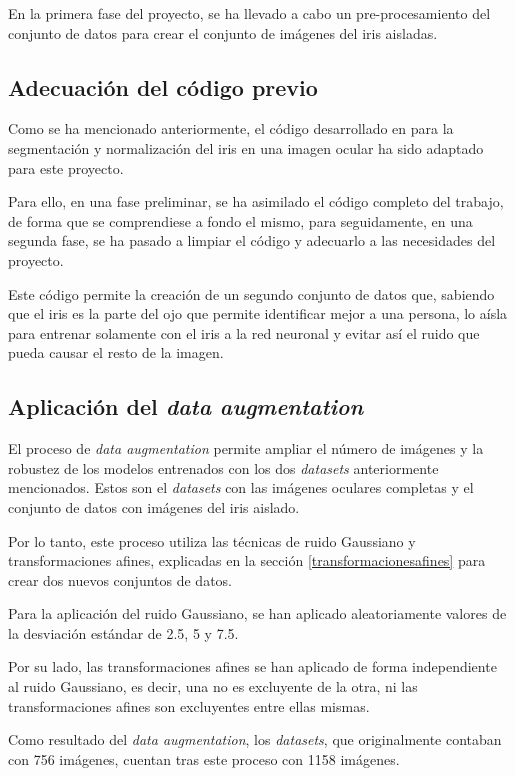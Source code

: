 En la primera fase del proyecto, se ha llevado a cabo un pre-procesamiento del conjunto de datos para crear el conjunto de imágenes del iris aisladas.

\subsection{Adecuación del código previo}

Como se ha mencionado anteriormente, el código desarrollado en \cite{tfg_iris_2020} para la segmentación y normalización del iris en una imagen ocular ha sido adaptado para este proyecto. 

Para ello, en una fase preliminar, se ha asimilado el código completo del trabajo, de forma que se comprendiese a fondo el mismo, para seguidamente, en una segunda fase, se ha pasado a limpiar el código y adecuarlo a las necesidades del proyecto. 

Este código permite la creación de un segundo conjunto de datos que, sabiendo que el iris es la parte del ojo que permite identificar mejor a una persona, lo aísla para entrenar solamente con el iris a la red neuronal y evitar así el ruido que pueda causar el resto de la imagen. 

\subsection{Aplicación del \textit{data augmentation}}

El proceso de \textit{data augmentation} permite ampliar el número de imágenes y la robustez de los modelos entrenados con los dos \textit{datasets} anteriormente mencionados. Estos son el \textit{datasets} con las imágenes oculares completas y el conjunto de datos con imágenes del iris aislado. 

Por lo tanto, este proceso utiliza las técnicas de ruido Gaussiano y transformaciones afines, explicadas en la sección \ref{transformacionesafines} para crear dos nuevos conjuntos de datos. 

Para la aplicación del ruido Gaussiano, se han aplicado aleatoriamente valores de la desviación estándar de 2.5, 5 y 7.5.

Por su lado, las transformaciones afines se han aplicado de forma independiente al ruido Gaussiano, es decir, una no es excluyente de la otra, ni las transformaciones afines son excluyentes entre ellas mismas. 

Como resultado del \textit{data augmentation}, los \textit{datasets}, que originalmente contaban con 756 imágenes, cuentan tras este proceso con 1158 imágenes.


